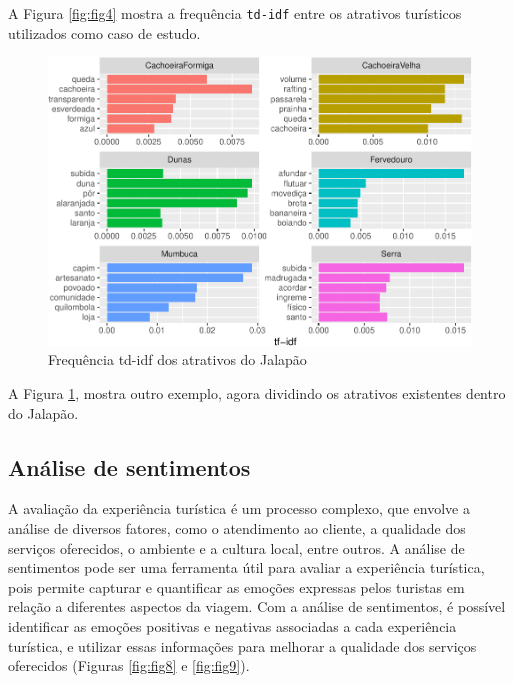 \documentclass[preprint, 3p,
authoryear]{elsarticle} %
\begin{document}
A Figura \ref{fig:fig4} mostra a frequência \texttt{td-idf} entre os
atrativos turísticos utilizados como caso de estudo.

\begin{figure}[H]

{\centering \includegraphics{bookdown-artigo_files/figure-latex/fig5-1} 

}

\caption{Frequência td-idf dos atrativos do Jalapão}\label{fig:fig5}
\end{figure}

A Figura \ref{fig:fig5}, mostra outro exemplo, agora dividindo os
atrativos existentes dentro do Jalapão.

\hypertarget{anuxe1lise-de-sentimentos}{%
\subsection{Análise de sentimentos}\label{anuxe1lise-de-sentimentos}}

A avaliação da experiência turística é um processo complexo, que envolve
a análise de diversos fatores, como o atendimento ao cliente, a
qualidade dos serviços oferecidos, o ambiente e a cultura local, entre
outros. A análise de sentimentos pode ser uma ferramenta útil para
avaliar a experiência turística, pois permite capturar e quantificar as
emoções expressas pelos turistas em relação a diferentes aspectos da
viagem. Com a análise de sentimentos, é possível identificar as emoções
positivas e negativas associadas a cada experiência turística, e
utilizar essas informações para melhorar a qualidade dos serviços
oferecidos (Figuras \ref{fig:fig8} e \ref{fig:fig9}).
\end{document}

